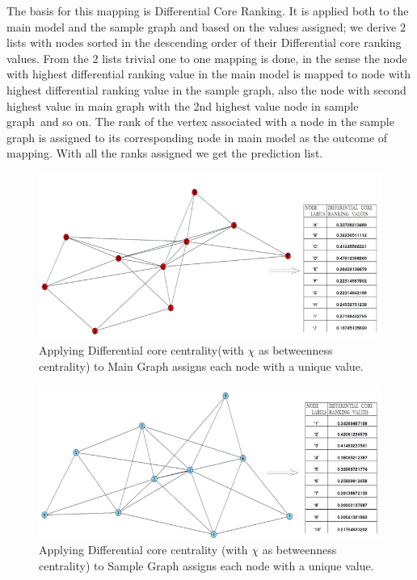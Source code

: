 \documentclass{article}
\begin{document}
The basis for this mapping is Differential Core Ranking. It is applied both to the main model and the sample graph and based on the values assigned; we derive 2 lists with nodes sorted in the descending order of their Differential core ranking values. From the 2 lists trivial one to one mapping is done, in the sense the node with highest differential ranking value in the main model is mapped to node with highest differential ranking value in the sample graph, also the node with second highest value in main graph with the 2nd highest value node in sample graph and so on. The rank of the vertex associated with a node in the sample graph is assigned to its corresponding node in main model as the outcome of mapping. With all the ranks assigned we get the prediction list.

\begin{figure}[htp]
\centering
\includegraphics[scale=0.13]{Figures/Mapping_Graph1.jpg}
\caption{Applying Differential core centrality(with $\chi$ as betweenness centrality) to Main Graph assigns each node with a unique value.}
\label{}
\end{figure}

\begin{figure}[htp]
\centering
\includegraphics[scale=0.14]{Figures/Mapping_Graph2.jpg}
\caption{Applying Differential core centrality (with $\chi$ as betweenness centrality) to Sample Graph assigns each node with a unique value.}
\label{}
\end{figure}
\end{document}
